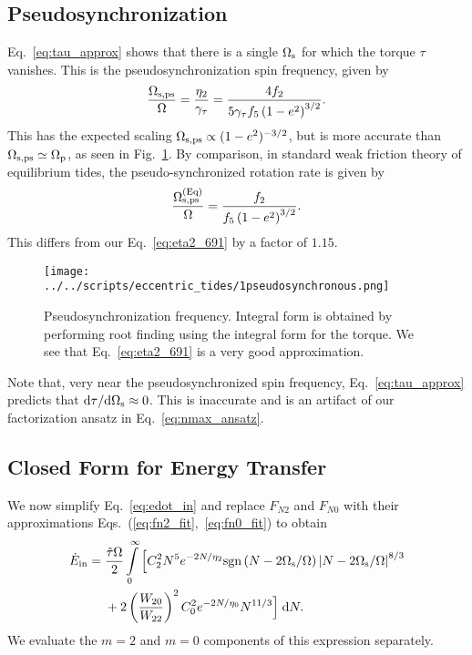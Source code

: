 \documentclass[
        fleqn,
        usenatbib,
    ]{mnras}
\newcommand*{\rdil}[2]{\mathrm{d}#1 / \mathrm{d}#2}
\newcommand*{\p}[1]{\left(#1\right)}
\begin{document}
\subsection{Pseudosynchronization}

Eq.~\eqref{eq:tau_approx} shows that there is a single $\Omega_{\rm s}$ for which the
torque $\tau$ vanishes. This is the pseudosynchronization spin frequency, given
by
\begin{equation}
    \frac{\Omega_{\rm s, ps}}{\Omega} =
        \frac{\eta_2}{\gamma_\tau} = \frac{4f_2}{5\gamma_\tau f_5\p{1 -
        e^2}^{3/2}}.\label{eq:eta2_691}
\end{equation}
This has the expected scaling $\Omega_{\rm s, ps} \propto (1 - e^2)^{-3/2}$,
but is more accurate than $\Omega_{\rm s, ps} \simeq \Omega_{\rm p}$, as seen
in Fig.~\ref{fig:pseudosync}. By comparison, in standard weak friction theory of
equilibrium tides, the pseudo-synchronized rotation rate is given by
\citep{alexander73, hut81}
\begin{equation}
    \frac{\Omega_{\rm s, ps}^{\rm (Eq)}}{\Omega} = \frac{f_2}{f_5\p{1 -
        e^2}^{3/2}}.
\end{equation}
This differs from our Eq.~\eqref{eq:eta2_691} by a factor of $1.15$.
\begin{figure}
    \centering
    \texttt{[image: ../../scripts/eccentric\_tides/1pseudosynchronous.png]}
    \caption{Pseudosynchronization frequency. Integral form is obtained by
    performing root finding using the integral form for the torque. We see that
    Eq.~\eqref{eq:eta2_691} is a very good approximation.}\label{fig:pseudosync}
\end{figure}

Note that, very near the pseudosynchronized spin frequency,
Eq.~\eqref{eq:tau_approx} predicts that $\rdil{\tau}{\Omega_{\rm s}} \approx 0$.
This is inaccurate and is an artifact of our factorization ansatz in
Eq.~\eqref{eq:nmax_ansatz}.

\subsection{Closed Form for Energy Transfer}

We now simplify Eq.~\eqref{eq:edot_in} and replace $F_{N2}$ and $F_{N0}$ with
their approximations Eqs.~(\ref{eq:fn2_fit},~\ref{eq:fn0_fit}) to obtain
\begin{align}
    \dot{E}_{\rm in} ={}&
        \frac{\hat{\tau} \Omega}{2} \int\limits_0^\infty \Big[
            C_2^2 N^5 e^{-2N/\eta_2} \mathrm{sgn}\left(N - 2\Omega_{\rm s} /
                \Omega\right) \left|N - 2 \Omega_{\rm s} /
                \Omega\right|^{8/3}\nonumber\\
            &+ 2 \p{\frac{W_{20}}{W_{22}}}^2 C_0^2 e^{-2N / \eta_0} N^{11/3}
        \Big]\;\mathrm{d}N.\label{eq:ein_int}
\end{align}
We evaluate the $m = 2$ and $m = 0$ components of this expression separately.
\end{document}
